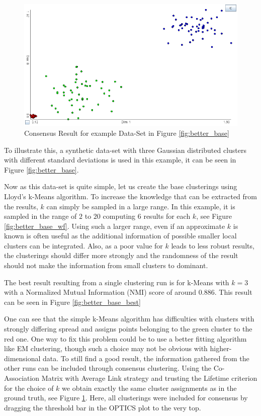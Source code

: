 \documentclass[
	a4paper,
	english,
	twoside,
	openright,               
	11pt                            
	]{report}
\begin{document}
\begin{figure}[h]
	\centering
	\includegraphics[scale=.4]{better_base_consensus}
	\caption{Consensus Result for example Data-Set in Figure \ref{fig:better_base}}
	\label{fig:better_base_consensus}
\end{figure}

To illustrate this, a synthetic data-set with three Gaussian distributed clusters with different standard deviations is used in this example, it can be seen in Figure \ref{fig:better_base}.

Now as this data-set is quite simple, let us create the base clusterings using Lloyd's k-Means algorithm. To increase the knowledge that can be extracted from the results, $k$ can simply be sampled in a large range. In this example, it is sampled in the range of $2$ to $20$ computing $6$ results for each $k$, see Figure \ref{fig:better_base_wf}. Using such a larger range, even if an approximate $k$ is known is often useful as the additional information of possible smaller local clusters can be integrated. Also, as a poor value for $k$ leads to less robust results, the clusterings should differ more strongly and the randomness of the result should not make the information from small clusters to dominant.

The best result resulting from a single clustering run is for k-Means with $k=3$ with a Normalized Mutual Information (NMI) score of around $0.886$. This result can be seen in Figure \ref{fig:better_base_best} 

One can see that the simple k-Means algorithm has difficulties with clusters with strongly differing spread and assigns points belonging to the green cluster to the red one. One way to fix this problem could be to use a better fitting algorithm like EM clustering, though such a choice may not be obvious with higher-dimensional data. To still find a good result, the information gathered from the other runs can be included through consensus clustering. Using the Co-Association Matrix with Average Link strategy and trusting the Lifetime criterion for the choice of $k$ we obtain exactly the same cluster assignments as in the ground truth, see Figure \ref{fig:better_base_consensus}. Here, all clusterings were included for consensus by dragging the threshold bar in the OPTICS plot to the very top.
\end{document}
